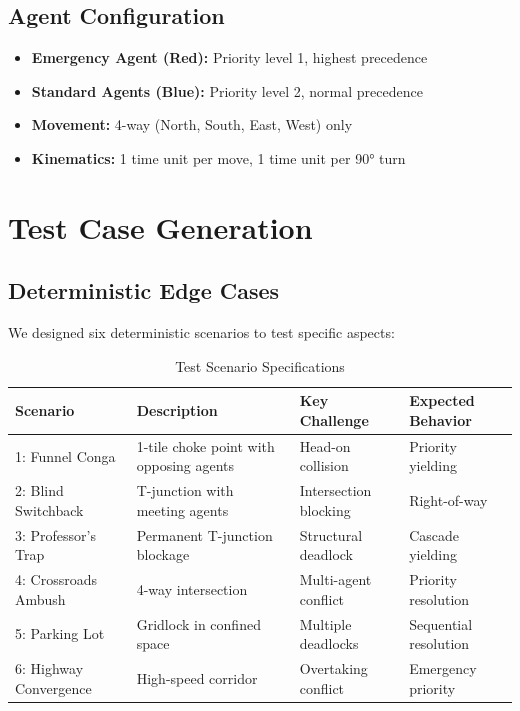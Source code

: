\documentclass[12pt, a4paper]{report}
\begin{document}
\subsection{Agent Configuration}
\begin{itemize}
    \item \textbf{Emergency Agent (Red):} Priority level 1, highest precedence
    \item \textbf{Standard Agents (Blue):} Priority level 2, normal precedence
    \item \textbf{Movement:} 4-way (North, South, East, West) only
    \item \textbf{Kinematics:} 1 time unit per move, 1 time unit per 90° turn
\end{itemize}

\section{Test Case Generation}

\subsection{Deterministic Edge Cases}
We designed six deterministic scenarios to test specific aspects:

\begin{table}[H]
\centering
\caption{Test Scenario Specifications}
\begin{tabular}{|p{2cm}|p{4cm}|p{4cm}|p{3cm}|}
\hline
\textbf{Scenario} & \textbf{Description} & \textbf{Key Challenge} & \textbf{Expected Behavior} \\
\hline
1: Funnel Conga & 1-tile choke point with opposing agents & Head-on collision & Priority yielding \\
2: Blind Switchback & T-junction with meeting agents & Intersection blocking & Right-of-way \\
3: Professor's Trap & Permanent T-junction blockage & Structural deadlock & Cascade yielding \\
4: Crossroads Ambush & 4-way intersection & Multi-agent conflict & Priority resolution \\
5: Parking Lot & Gridlock in confined space & Multiple deadlocks & Sequential resolution \\
6: Highway Convergence & High-speed corridor & Overtaking conflict & Emergency priority \\
\hline
\end{tabular}
\end{table}
\end{document}
